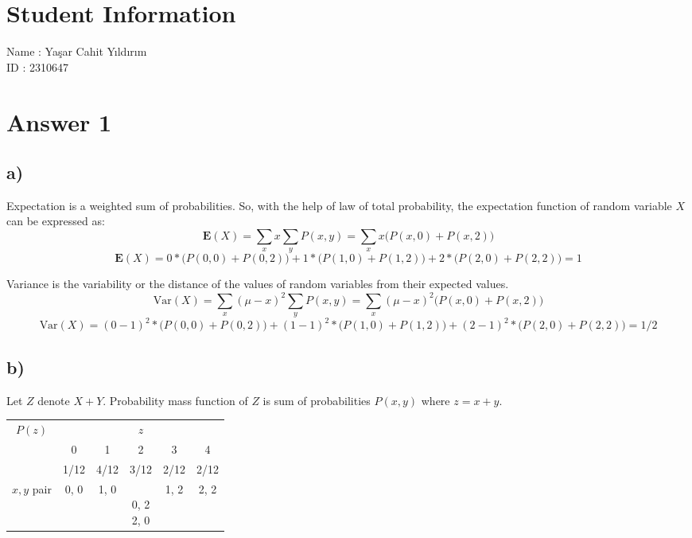 \documentclass[12pt]{article}
\begin{document}
\section*{Student Information}

Name : Yaşar Cahit Yıldırım \\

ID : 2310647 \\


\section*{Answer 1}
\subsection*{a)}

Expectation is a weighted sum of probabilities. So, with the help of law of total probability, the expectation function of random variable $X$ can be expressed as:
$$\textbf{E}(X) = \sum_{x} x\sum_{y} P(x, y) = \sum_{x} x\big(P(x, 0) + P(x, 2)\big)$$
$$\textbf{E}(X) = 0*\big(P(0, 0) + P(0, 2)\big) + 1*\big(P(1, 0) + P(1, 2)\big) + 2*\big(P(2, 0) + P(2, 2)\big) = 1$$
\newline

Variance is the variability or the distance of the values of random variables from their expected values.
$$\text{Var}(X) = \sum_{x} (\mu - x)^2 \sum_{y} P(x, y) = \sum_{x} (\mu - x)^2 \big(P(x, 0) + P(x, 2)\big)$$
$$\text{Var}(X) = (0-1)^2*\big(P(0, 0) + P(0, 2)\big) + (1-1)^2*\big(P(1, 0) + P(1, 2)\big) + (2-1)^2*\big(P(2, 0) + P(2, 2)\big) = 1/2$$

\subsection*{b)}

Let $Z$ denote $X+Y$. Probability mass function of $Z$ is sum of probabilities $P(x, y)$ where $z = x + y$.
\begin{table}[H]
    \centering
    \begin{tabular}{|c||c|c|c|c|c|}
    \hline
        \multirow{2}{*}{$P(z)$} & \multicolumn{5}{c|}{$z$}                                     \\
        \cline{2-6}
                              & 0    & 1    & 2                              & 3    & 4    \\
        \cline{2-6}
                              & 1/12 & 4/12 & 3/12                           & 2/12 & 2/12 \\
        \hline
        \shortstack{ \\ $x, y$ \\ pair } & 0, 0 & 1, 0 & \shortstack{ \\ 0, 2 \\ 2, 0 } & 1, 2 & 2, 2 \\
        \hline
    \end{tabular}
\end{table}
\end{document}
